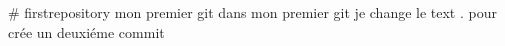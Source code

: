 # firstrepository
mon premier git 
dans mon premier git je change le text . pour crée un deuxiéme commit
